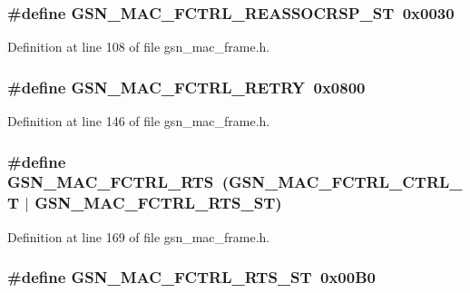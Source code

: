 \hypertarget{a00523_aed2d11f1d977251b059eb9d85d8dc545}{
\subsubsection[{GSN\_\-MAC\_\-FCTRL\_\-REASSOCRSP\_\-ST}]{\setlength{\rightskip}{0pt plus 5cm}\#define GSN\_\-MAC\_\-FCTRL\_\-REASSOCRSP\_\-ST~0x0030}}
\label{a00523_aed2d11f1d977251b059eb9d85d8dc545}


Definition at line 108 of file gsn\_\-mac\_\-frame.h.

\hypertarget{a00523_a9fc182abd66e27f6a095fbfdfe5635e8}{
\subsubsection[{GSN\_\-MAC\_\-FCTRL\_\-RETRY}]{\setlength{\rightskip}{0pt plus 5cm}\#define GSN\_\-MAC\_\-FCTRL\_\-RETRY~0x0800}}
\label{a00523_a9fc182abd66e27f6a095fbfdfe5635e8}


Definition at line 146 of file gsn\_\-mac\_\-frame.h.

\hypertarget{a00523_ae3e4aa31cd1c03793be65a270b017817}{
\subsubsection[{GSN\_\-MAC\_\-FCTRL\_\-RTS}]{\setlength{\rightskip}{0pt plus 5cm}\#define GSN\_\-MAC\_\-FCTRL\_\-RTS~(GSN\_\-MAC\_\-FCTRL\_\-CTRL\_\-T    $|$ GSN\_\-MAC\_\-FCTRL\_\-RTS\_\-ST)}}
\label{a00523_ae3e4aa31cd1c03793be65a270b017817}


Definition at line 169 of file gsn\_\-mac\_\-frame.h.

\hypertarget{a00523_a834605e143a337b19f610c8c8995679c}{
\subsubsection[{GSN\_\-MAC\_\-FCTRL\_\-RTS\_\-ST}]{\setlength{\rightskip}{0pt plus 5cm}\#define GSN\_\-MAC\_\-FCTRL\_\-RTS\_\-ST~0x00B0}}
\label{a00523_a834605e143a337b19f610c8c8995679c}



